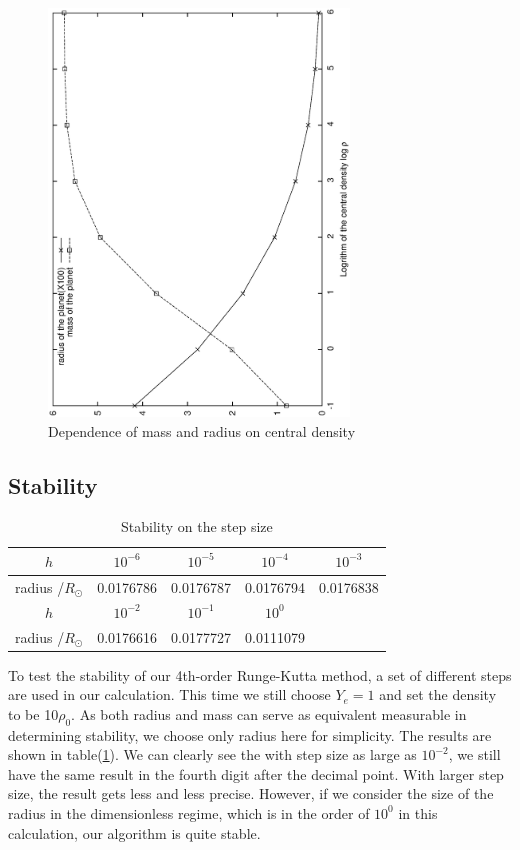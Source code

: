 \documentclass{article}
\begin{document}
\begin{figure}[H]
\centering
\includegraphics[width=8cm,angle=270]{m_r_rho.eps}
\caption{Dependence of mass and radius on central density}
\label{fig:rho_dependence}
\end{figure}

\subsection{Stability}

\begin{table}[H]
\centering
\begin{tabular}{|c|c|c|c|c|}
\hline
$h$& $10^{-6}$& $10^{-5}$ & $10^{-4}$  & $10^{-3}$  \\
\hline
radius /$R_{\odot}$& 0.0176786&  0.0176787&   0.0176794&  0.0176838\\
\hline
$h$&  $10^{-2}$  & $10^{-1}$  & $10^{0}$  & \\
\hline
radius /$R_{\odot}$& 0.0176616& 0.0177727& 0.0111079 &\\
\hline
\end{tabular}
\caption{Stability on the step size}
\label{tab:stability}
\end{table}
 To test the stability of our 4th-order Runge-Kutta method, a set of different steps are used in our calculation. This time we still choose $Y_e=1$ and set the density to be 10$\rho_0$. As both radius and mass can serve as equivalent measurable in determining stability, we choose only radius here for simplicity. The results are shown in table(\ref{tab:stability}). We can clearly see the with step size as large as $10^{-2}$, we still have the same result in the fourth digit after the decimal point. With larger step size, the result gets less and less precise. However, if we consider the size of the radius in the dimensionless regime, which is in the order of $10^0$ in this calculation, our algorithm is quite stable.
\end{document}
